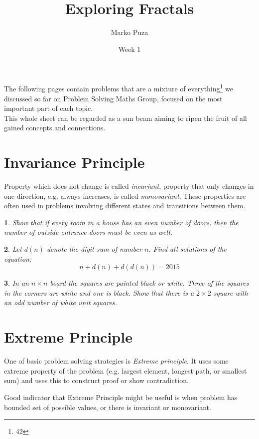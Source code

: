 \documentclass[12pt]{article}
\title{\textbf{Exploring Fractals}}
\date{Week 1}
\author{Marko Puza\\}
\newtheorem{problem}{}
\begin{document}
\maketitle

\noindent The following pages contain problems that are a mixture of everything\footnote{42} we discussed so far on Problem Solving Maths Group, focused on the most important part of each topic.\\
This whole sheet can be regarded as a sun beam aiming to ripen the fruit of all gained concepts and connections.

\section{Invariance Principle}
Property which does not change is called \emph{invariant}, property that only changes in one direction, e.g. always increases, is called \emph{monovariant}. These properties are often used in problems involving different states and transitions between them. 

\begin{problem}
Show that if every room in a house has an even number of doors,
then the number of outside entrance doors must be even as well.
 \end{problem}
 
\begin{problem}
Let $d(n)$ denote the digit sum of number $n$. Find all solutions of the equation: \[n + d(n) + d(d(n)) = 2015\]
\end{problem}

\begin{problem}
In an $n \times n$ board the squares are painted black or white. Three of the squares in the corners are white and one is black. Show that there is a $2 \times 2$ square with an odd number of white unit squares.
 \end{problem}

\section{Extreme Principle}

One of basic problem solving strategies is \emph{Extreme principle}. It uses some extreme property of the problem (e.g. largest element, longest path, or smallest sum) and uses this to construct proof or show contradiction. 

Good indicator that Extreme Principle might be useful is when problem has bounded set of possible values, or there is invariant or monovariant.
\end{document}

